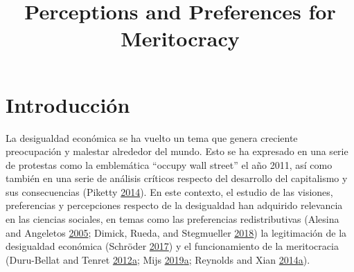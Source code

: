 \documentclass[
]{article}
\title{Perceptions and Preferences for Meritocracy}
\author{}
\date{\vspace{-2.5em}}
\begin{document}
\maketitle

\hypertarget{introducciuxf3n}{%
\section{Introducción}\label{introducciuxf3n}}

La desigualdad económica se ha vuelto un tema que genera creciente
preocupación y malestar alrededor del mundo. Esto se ha expresado en una
serie de protestas como la emblemática ``occupy wall street'' el año
2011, así como también en una serie de análisis críticos respecto del
desarrollo del capitalismo y sus consecuencias (Piketty
\protect\hyperlink{ref-PikettyCapitalTwentyFirstCentury2014b}{2014}). En
este contexto, el estudio de las visiones, preferencias y percepciones
respecto de la desigualdad han adquirido relevancia en las ciencias
sociales, en temas como las preferencias redistributivas (Alesina and
Angeletos \protect\hyperlink{ref-alesina_Fairness_2005}{2005}; Dimick,
Rueda, and Stegmueller \protect\hyperlink{ref-dimick_Models_2018}{2018})
la legitimación de la desigualdad económica (Schröder
\protect\hyperlink{ref-schroder_Income_2017}{2017}) y el funcionamiento
de la meritocracia (Duru-Bellat and Tenret
\protect\hyperlink{ref-Duru-BellatWhoMeritocracyIndividual2012b}{2012}\protect\hyperlink{ref-Duru-BellatWhoMeritocracyIndividual2012b}{a};
Mijs
\protect\hyperlink{ref-MijsParadoxInequalityIncome2019b}{2019}\protect\hyperlink{ref-MijsParadoxInequalityIncome2019b}{a};
Reynolds and Xian
\protect\hyperlink{ref-ReynoldsPerceptionsMeritocracyLand2014b}{2014}\protect\hyperlink{ref-ReynoldsPerceptionsMeritocracyLand2014b}{a}).
\end{document}
